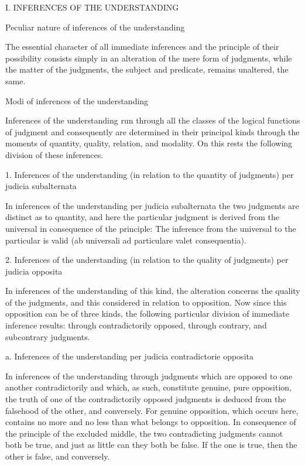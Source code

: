 I. INFERENCES OF THE UNDERSTANDING

Peculiar nature of inferences of the understanding

The essential character of all immediate inferences
and the principle of their possibility consists simply in
an alteration of the mere form of judgments,
while the matter of the judgments, the subject and predicate,
remains unaltered, the same.

Modi of inferences of the understanding

Inferences of the understanding run through
all the classes of the logical functions of judgment
and consequently are determined in their principal kinds
through the moments of quantity, quality, relation, and modality.
On this rests the following division of these inferences.

1.  Inferences of the understanding
    (in relation to the quantity of judgments)
    per judicia subalternata

In inferences of the understanding per judicia subalternata
the two judgments are distinct as to quantity,
and here the particular judgment is derived from the universal
in consequence of the principle:
The inference from the universal to the particular is valid
(ab universali ad particulare valet consequentia).

2.  Inferences of the understanding
    (in relation to the quality of judgments)
    per judicia opposita

In inferences of the understanding of this kind,
the alteration concerns the quality of the judgments,
and this considered in relation to opposition.
Now since this opposition can be of three kinds,
the following particular division of immediate inference results:
through contradictorily opposed, through contrary, and subcontrary judgments.

a.  Inferences of the understanding
    per judicia contradictorie opposita

In inferences of the understanding through judgments
which are opposed to one another contradictorily
and which, as such, constitute genuine, pure opposition,
the truth of one of the contradictorily opposed judgments
is deduced from the falsehood of the other, and conversely.
For genuine opposition, which occurs here,
contains no more and no less than what belongs to opposition.
In consequence of the principle of the excluded middle,
the two contradicting judgments cannot both be true,
and just as little can they both be false.
If the one is true, then the other is false, and conversely.

